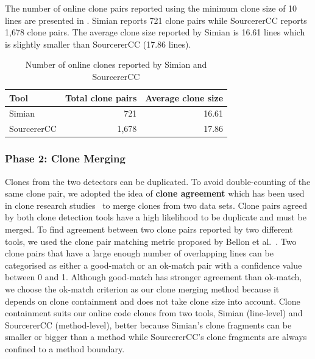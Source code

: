 \documentclass[10pt,journal,compsoc]{IEEEtran}
\begin{document}
%
The number of online clone pairs reported using the minimum clone size of 10 lines
are presented in . Simian reports 721 clone
pairs while SourcererCC reports 1,678 clone pairs. 
The average clone size reported by Simian is
16.61 lines which is slightly smaller than SourcererCC (17.86 lines).

\begin{table}
	\centering
	\caption{Number of online clones reported by Simian and SourcererCC}
	\label{tab:orig_stats}
	\begin{tabular}{lrr}
		\toprule
		Tool & \multicolumn{1}{c}{Total clone pairs} & \multicolumn{1}{c}{Average clone size} \\
		\midrule
		Simian & 721 & 16.61 \\
		SourcererCC & 1,678 & 17.86 \\
		\bottomrule
	\end{tabular} %
\end{table}

\subsubsection{Phase 2: Clone Merging} Clones from the two detectors can be
duplicated. To avoid double-counting of the same clone pair, we adopted the idea
of \textbf{clone agreement} which has been used in clone research
studies~\cite{Funaro2010, Wang2013,cr2016ssbse} to merge clones from two data
sets. Clone pairs agreed by both clone detection tools have a high
likelihood to be duplicate and must be merged. 
To find agreement between two clone
pairs reported by two different tools, we used the clone pair matching metric
proposed by Bellon et al.~\cite{Bellon2007}. Two clone pairs that have a large
enough number of overlapping lines can be categorised as either a good-match or
an ok-match pair with a
confidence value between 0 and 1. Although good-match has stronger agreement
than ok-match, we choose the ok-match criterion as our clone merging method
because it depends on clone containment and does
not take clone size into account. Clone containment suits our online code clones
from two tools, Simian (line-level) and SourcererCC (method-level), better
because Simian's clone fragments can be smaller or bigger than a method
while SourcererCC's clone fragments are always confined to a method boundary.
\end{document}
